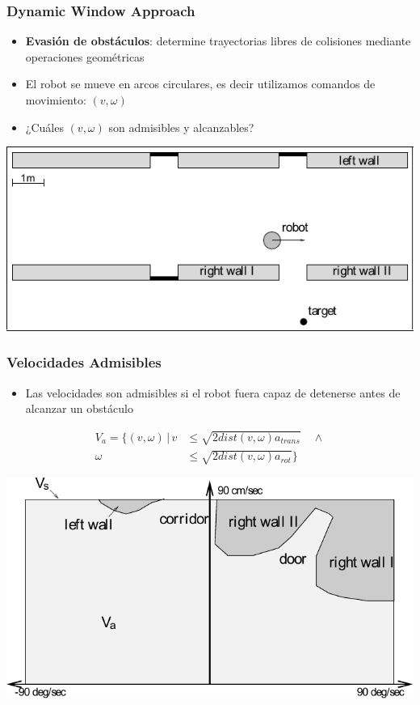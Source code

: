 \begin{frame}
	\frametitle{Dynamic Window Approach}
	
    \begin{itemize}
        \item \textbf{Evasión de obstáculos}: determine trayectorias libres de colisiones mediante operaciones geométricas
        \item El robot se mueve en arcos circulares, es decir utilizamos comandos de movimiento: $(v,\omega)$
        \item ¿Cuáles $(v,\omega)$ son admisibles y alcanzables?
    \end{itemize}
    
    \begin{center}
        \includegraphics[width=0.6\columnwidth]{images/dynamic_window_approach_robot_world.pdf}
    \end{center}
    
\end{frame}

\begin{frame}
    \frametitle{Velocidades Admisibles}
    
    \begin{itemize}
        \item Las velocidades son admisibles si el robot fuera capaz de detenerse antes de alcanzar un obstáculo
    \end{itemize}
    
    \begin{align*}
        V_{a} = \{ (v,\omega) \, | \,
              v &\leq \sqrt{2 dist(v,\omega) a_{trans}} \quad \land \\
         \omega &\leq \sqrt{2 dist(v,\omega) a_{rot}} \}
    \end{align*}
    
    \begin{center}
        \includegraphics[width=0.6\columnwidth]{images/dynamic_window_approach_admissible_velocities.pdf}
    \end{center}
    
\end{frame}

